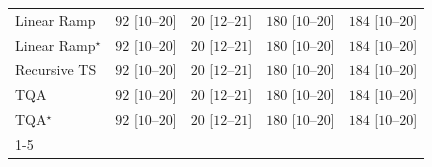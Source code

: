 \begin{tabular}{l|cccc|}
Linear Ramp & {\cellcolor[HTML]{75C477}} \color[HTML]{000000} $92$ [$10$--$20$] & {\cellcolor[HTML]{E8F6E4}} \color[HTML]{000000} $20$ [$12$--$21$] & {\cellcolor[HTML]{004A1E}} \color[HTML]{F1F1F1} $180$ [$10$--$20$] & {\cellcolor[HTML]{00441B}} \color[HTML]{F1F1F1} $184$ [$10$--$20$] \\
Linear Ramp$^\star$ & {\cellcolor[HTML]{75C477}} \color[HTML]{000000} $92$ [$10$--$20$] & {\cellcolor[HTML]{E8F6E4}} \color[HTML]{000000} $20$ [$12$--$21$] & {\cellcolor[HTML]{004A1E}} \color[HTML]{F1F1F1} $180$ [$10$--$20$] & {\cellcolor[HTML]{00441B}} \color[HTML]{F1F1F1} $184$ [$10$--$20$] \\
Recursive TS & {\cellcolor[HTML]{75C477}} \color[HTML]{000000} $92$ [$10$--$20$] & {\cellcolor[HTML]{E8F6E4}} \color[HTML]{000000} $20$ [$12$--$21$] & {\cellcolor[HTML]{004A1E}} \color[HTML]{F1F1F1} $180$ [$10$--$20$] & {\cellcolor[HTML]{00441B}} \color[HTML]{F1F1F1} $184$ [$10$--$20$] \\
TQA & {\cellcolor[HTML]{75C477}} \color[HTML]{000000} $92$ [$10$--$20$] & {\cellcolor[HTML]{E8F6E4}} \color[HTML]{000000} $20$ [$12$--$21$] & {\cellcolor[HTML]{004A1E}} \color[HTML]{F1F1F1} $180$ [$10$--$20$] & {\cellcolor[HTML]{00441B}} \color[HTML]{F1F1F1} $184$ [$10$--$20$] \\
TQA$^\star$ & {\cellcolor[HTML]{75C477}} \color[HTML]{000000} $92$ [$10$--$20$] & {\cellcolor[HTML]{E8F6E4}} \color[HTML]{000000} $20$ [$12$--$21$] & {\cellcolor[HTML]{004A1E}} \color[HTML]{F1F1F1} $180$ [$10$--$20$] & {\cellcolor[HTML]{00441B}} \color[HTML]{F1F1F1} $184$ [$10$--$20$] \\
\cline{1-5}
\bottomrule
\end{tabular}
